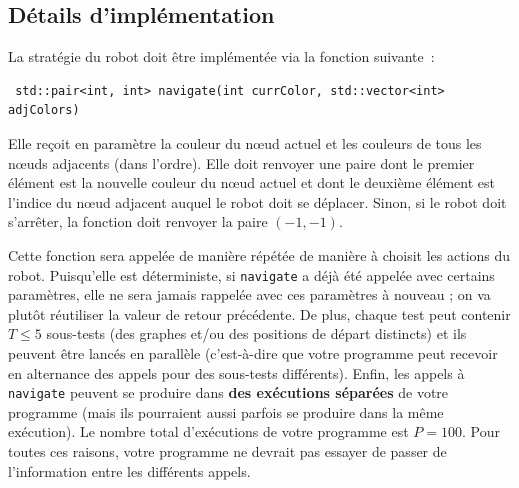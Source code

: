 \documentclass[12pt]{article}
\begin{document}
\subsection{Détails d'implémentation}
La stratégie du robot doit être implémentée via la fonction suivante :
\begin{lstlisting}
 std::pair<int, int> navigate(int currColor, std::vector<int> adjColors)
\end{lstlisting}

Elle reçoit en paramètre la couleur du nœud actuel et les couleurs de tous les nœuds adjacents (dans l'ordre). Elle doit renvoyer une paire dont le premier élément est la nouvelle couleur du nœud actuel et dont le deuxième élément est l'indice du nœud adjacent auquel le robot doit se déplacer. Sinon, si le robot doit s'arrêter, la fonction doit renvoyer la paire $(-1,-1)$.

Cette fonction sera appelée de manière répétée de manière à choisit les actions du robot. Puisqu'elle est déterministe, si \texttt{navigate} a déjà été appelée avec certains paramètres, elle ne sera jamais rappelée avec ces paramètres à nouveau ; on va plutôt réutiliser la valeur de retour précédente. De plus, chaque test peut contenir $T \leq 5$ sous-tests (des graphes et/ou des positions de départ distincts) et ils peuvent être lancés en parallèle (c'est-à-dire que votre programme peut recevoir en alternance des appels pour des sous-tests différents). Enfin, les appels à \texttt{navigate} peuvent se produire dans \textbf{des exécutions séparées} de votre programme (mais ils pourraient aussi parfois se produire dans la même exécution). Le nombre total d'exécutions de votre programme est $P=100$. Pour toutes ces raisons, votre programme ne devrait pas essayer de passer de l'information entre les différents appels.
\end{document}
